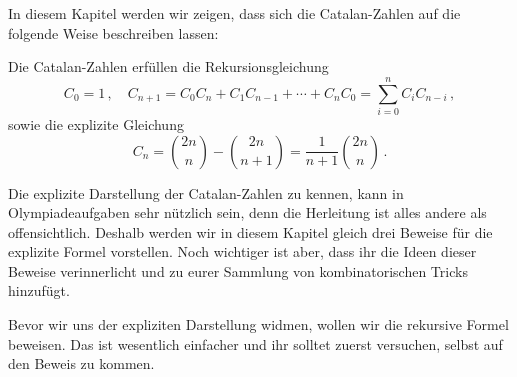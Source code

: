 In diesem Kapitel werden wir zeigen, dass sich die Catalan-Zahlen auf die folgende Weise beschreiben lassen:
\begin{satzmitnamen}[Satz]
	Die Catalan-Zahlen erfüllen die Rekursionsgleichung
	\begin{equation*}
		C_0=1\,,\quad C_{n+1}=C_0C_n+C_1C_{n-1}+\dotsb+C_nC_0=\sum_{i=0}^nC_iC_{n-i}\,,
	\end{equation*}
	sowie die explizite Gleichung
	\begin{equation*}
		C_n=\binom{2n}{n}-\binom{2n}{n+1}=\frac{1}{n+1}\binom{2n}{n}\,.
	\end{equation*}
\end{satzmitnamen}
Die explizite Darstellung der Catalan-Zahlen zu kennen, kann in Olympiadeaufgaben sehr nützlich sein, denn die Herleitung ist alles andere als offensichtlich. Deshalb werden wir in diesem Kapitel gleich drei Beweise für die explizite Formel vorstellen. Noch wichtiger ist aber, dass ihr die Ideen dieser Beweise verinnerlicht und zu eurer Sammlung von kombinatorischen Tricks hinzufügt.

Bevor wir uns der expliziten Darstellung widmen, wollen wir die rekursive Formel beweisen. Das ist wesentlich einfacher und ihr solltet zuerst versuchen, selbst auf den Beweis zu kommen.

